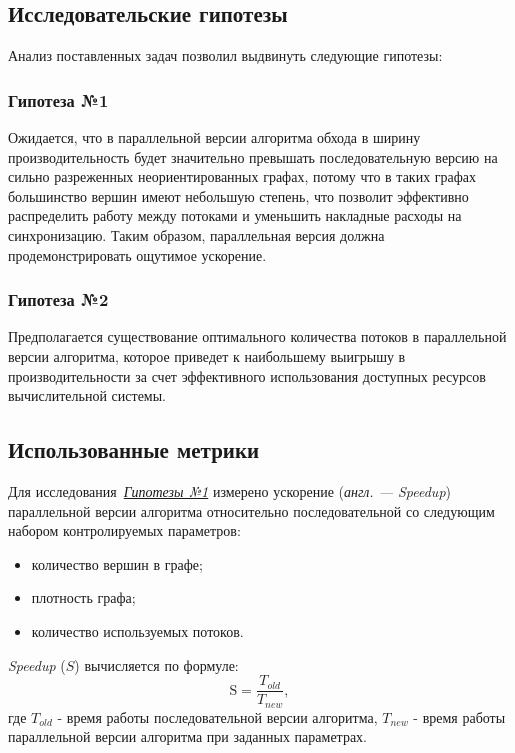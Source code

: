 \subsection{Исследовательские гипотезы}
Анализ поставленных задач позволил выдвинуть следующие гипотезы:
{\parindent0pt
    
    \subsubsection*{Гипотеза №1}
    \label{t1}
    Ожидается, что в параллельной версии алгоритма обхода в ширину производительность будет значительно превышать последовательную версию на сильно разреженных неориентированных графах, потому что в таких графах большинство вершин имеют небольшую степень, что позволит эффективно распределить работу между потоками и уменьшить накладные расходы на синхронизацию. Таким образом, параллельная версия должна продемонстрировать ощутимое ускорение.
}
{\parindent0pt
    \subsubsection*{Гипотеза №2}
    \label{t2}
    Предполагается существование оптимального количества потоков в параллельной версии алгоритма, которое приведет к наибольшему выигрышу в производительности за счет эффективного использования доступных ресурсов вычислительной системы.
}



\subsection{Использованные метрики}
Для исследования~\hyperref[t1]{\textit{Гипотезы №1}} измерено ускорение (\textit{англ. --- Speedup}) параллельной версии алгоритма относительно последовательной со следующим набором контролируемых параметров:
\begin{itemize}
    \item количество вершин в графе;
    \item плотность графа;
    \item количество используемых потоков.
\end{itemize}
\textit{Speedup} ($S$) вычисляется по формуле:
\begin{equation}
\label{eq:speedup}
	\text{S} = \frac{T_{old}}{T_{new}},
\end{equation}
где $T_{old}$ - время работы последовательной версии алгоритма, $T_{new}$ - время работы параллельной версии алгоритма при заданных параметрах.

